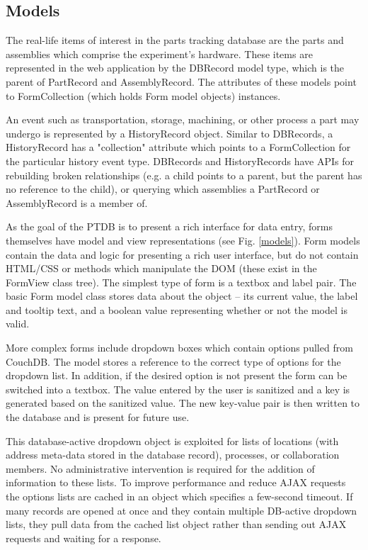 \documentclass[journal]{IEEEtran}
\begin{document}
\subsection{Models}
The real-life items of interest in the parts tracking database are the parts and assemblies which comprise
the experiment's hardware. These items are represented in the web application by the DBRecord model type, which is
the parent of PartRecord and AssemblyRecord. The attributes of these models point to FormCollection (which holds
Form model objects) instances.

An event such as transportation, storage, machining, or other process a part may undergo is represented by a 
HistoryRecord object. Similar to DBRecords, a HistoryRecord has a "collection" attribute which points to a
FormCollection for the particular history event type. DBRecords and HistoryRecords have APIs for rebuilding
broken relationships (e.g. a child points to a parent, but the parent has no reference to the child), or querying
which assemblies a PartRecord or AssemblyRecord is a member of.

As the goal of the PTDB is to present a rich interface for data entry, forms
themselves have model and view representations (see Fig. \ref{models}). 
Form models contain the data and logic for presenting a rich user interface, but do not contain HTML/CSS or
methods which manipulate the DOM (these exist in the FormView class tree).
The simplest type of form is a textbox and label pair. The basic Form model class stores data 
about the object -- its current value, the label and tooltip text,
and a boolean value representing whether or not the model is valid.

More complex forms include dropdown boxes which contain options pulled from CouchDB. The model
stores a reference to the correct type of options for the dropdown list. In addition, if the 
desired option is not present the form can be switched into a textbox. The value entered by
the user is sanitized and a key is generated based on the sanitized value. The new key-value
pair is then written to the database and is present for future use.

This database-active dropdown object is exploited for lists of locations (with address meta-data
stored in the database record), processes, or collaboration members. No administrative intervention
is required for the addition of information to these lists. To improve performance and reduce
AJAX requests the options lists are cached in an object which specifies a few-second timeout.
If many records are opened at once and they contain multiple DB-active dropdown lists, they 
pull data from the cached list object rather than sending out AJAX requests and waiting for 
a response.
\end{document}
